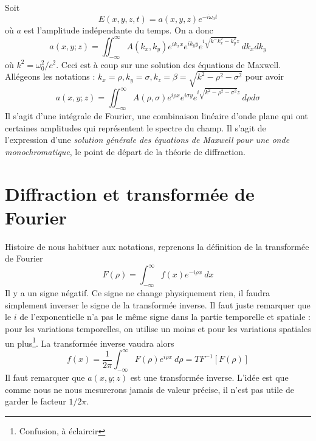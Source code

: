 Soit 
\begin{equation}
E(x,y,z,t) = a(x,y,z)e^{-i\omega_0t}
\end{equation}
où $a$ est l'amplitude indépendante du temps. On a donc
\begin{equation}
a(x,y;z) = \iint_{-\infty}^\infty A(k_x,k_y) e^{ik_xx}e^{ik_yy}e^{i 
\sqrt{k^-k_x^2-k_y^2} z}\ dk_xdk_y
\end{equation}
où $k^2 = \omega_0^2/c^2$. Ceci est à coup sur une solution des équations de Maxwell. Allégeons 
les notations : $k_x=\rho, k_y=\sigma, k_z=\beta=\sqrt{k^2-\rho^2-\sigma^2}$ pour avoir
\begin{equation}
a(x,y;z) = \iint_{-\infty}^\infty A(\rho,\sigma)e^{i\rho x}e^{i\sigma y} e^{i\sqrt{k^2-\rho^2-
\sigma^2}z}\ d\rho d\sigma
\end{equation}
Il s'agit d'une intégrale de Fourier, une combinaison linéaire d'onde plane qui ont certaines 
amplitudes qui représentent le spectre du champ. Il s'agit de l'expression d'une \textit{solution 
générale des équations de Maxwell pour une onde monochromatique}, le point de départ de la 
théorie de diffraction.


\newpage
\section{Diffraction et transformée de Fourier}
Histoire de nous habituer aux notations, reprenons la définition de la transformée de Fourier
\begin{equation}
F(\rho) = \int_{-\infty}^\infty f(x)e^{-i\rho x}\ dx
\end{equation}
\danger Il y a un signe négatif. Ce signe ne change physiquement rien, il faudra simplement 
inverser le signe de la transformée inverse. Il faut juste remarquer que le $i$ de l'exponentielle 
n'a pas le même signe dans la partie temporelle et spatiale : pour les variations temporelles, on utilise un 
moins et pour les variations spatiales un plus\footnote{Confusion, à éclaircir}. La transformée 
inverse vaudra alors
\begin{equation}
f(x) = \dfrac{1}{2\pi}\int_{-\infty}^\infty F(\rho)e^{i\rho x}\ d\rho = TF^{-1}[F(\rho)]
\end{equation}
Il faut remarquer que $a(x,y;z)$ est une transformée inverse. L'idée est que comme nous ne nous 
mesurerons jamais de valeur précise, il n'est pas utile de garder le facteur $1/2\pi$.\\

